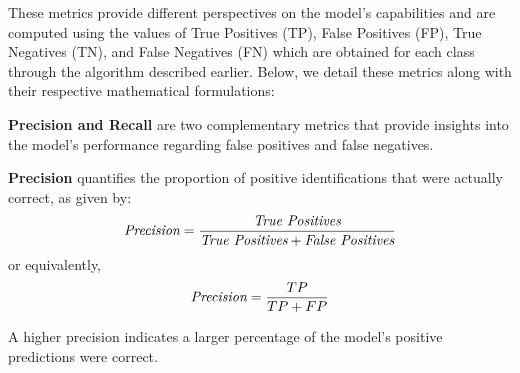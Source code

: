 \documentclass[11pt, a4paper,oneside,chapterprefix=false]{scrbook}
\begin{document}
\vspace{10pt}

These metrics provide different perspectives on the model's capabilities and are computed using the values of True Positives (TP), False Positives (FP), True Negatives (TN), and False Negatives (FN) which are obtained for each class through the algorithm described earlier. Below, we detail these metrics along with their respective mathematical formulations:

\vspace{10pt}







\textbf{Precision and Recall} are two complementary metrics that provide insights into the model's performance regarding false positives and false negatives. 

\vspace{10pt}

\textbf{Precision} quantifies the proportion of positive identifications that were actually correct, as given by:
\[
    \emph{Precision} = \frac{\emph{True Positives}}{\emph{True Positives} + \emph{False Positives}}
\]
or equivalently,
\[
    \emph{Precision} = \frac{TP}{TP + FP}
\]

A higher precision indicates a larger percentage of the model's positive predictions were correct.
\end{document}

